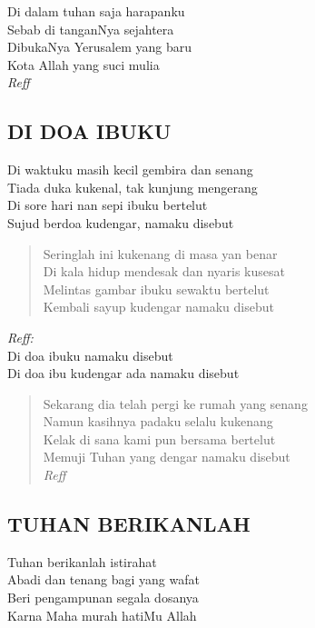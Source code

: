 \begin{altverse}
Di dalam tuhan saja harapanku\\
Sebab di tanganNya sejahtera\\
DibukaNya Yerusalem yang baru\\
Kota Allah yang suci mulia\\
\textit{Reff}
\end{altverse}



\subsection{ DI DOA IBUKU}
\begin{altverse}
Di waktuku masih kecil gembira dan senang\\
Tiada duka kukenal, tak kunjung mengerang\\
Di sore hari nan sepi ibuku bertelut\\
Sujud berdoa kudengar, namaku disebut
\end{altverse}

\begin{verse}
Seringlah ini kukenang di masa yan benar\\
Di kala hidup mendesak dan nyaris kusesat\\
Melintas gambar ibuku sewaktu bertelut\\
Kembali sayup kudengar namaku disebut
\end{verse}

\begin{altverse}
\textit{Reff:}\\
Di doa ibuku namaku disebut\\
Di doa ibu kudengar ada namaku disebut
\end{altverse}

\begin{verse}
Sekarang dia telah pergi ke rumah yang senang\\
Namun kasihnya padaku selalu kukenang\\
Kelak di sana kami pun bersama bertelut\\
Memuji Tuhan yang dengar namaku disebut\\
\textit{Reff}
\end{verse}

\subsection{ TUHAN BERIKANLAH}
\begin{altverse}
Tuhan berikanlah istirahat\\
Abadi dan tenang bagi yang wafat\\
Beri pengampunan segala dosanya\\
Karna Maha murah hatiMu Allah
\end{altverse}

